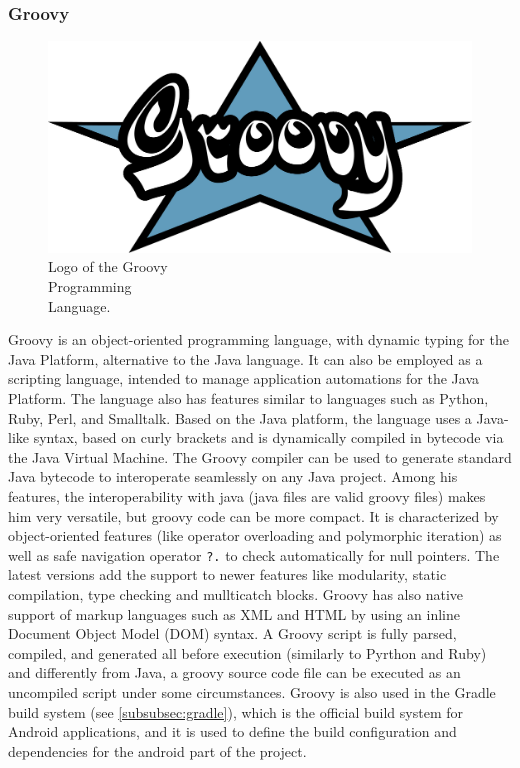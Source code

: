 \subsubsection{Groovy}

\begin{figure} %
    \captionsetup{font=footnotesize}
    \centering
    \includegraphics[width=\linewidth]{images/groovy.png}
    \caption{Logo of the Groovy\\Programming\\Language.}
\end{figure}

Groovy is an object-oriented programming language, with dynamic typing for the Java Platform, alternative to the Java language. It can also be employed as a scripting language, intended to manage application automations for the Java Platform. The language also has features similar to languages such as Python, Ruby, Perl, and Smalltalk. Based on the Java platform, the language uses a Java-like syntax, based on curly brackets and is dynamically compiled in bytecode via the Java Virtual Machine. The Groovy compiler can be used to generate standard Java bytecode to interoperate seamlessly on any Java project. Among his features, the interoperability with java (java files are valid groovy files) makes him very versatile, but groovy code can be more compact. It is characterized by object-oriented features (like operator overloading and polymorphic iteration) as well as safe navigation operator \texttt{?.} to check automatically for null pointers. The latest versions add the support to newer features like modularity, static compilation, type checking and mullticatch blocks. Groovy has also native support of markup languages such as XML and HTML by using an inline Document Object Model (DOM) syntax. A Groovy script is fully parsed, compiled, and generated all before execution (similarly to Pyrthon and Ruby) and differently from Java, a groovy source code file can be executed as an uncompiled script under some circumstances\cite{Groovy}. Groovy is also used in the Gradle build system (see \cref{subsubsec:gradle}), which is the official build system for Android applications, and it is used to define the build configuration and dependencies for the android part of the project.  

